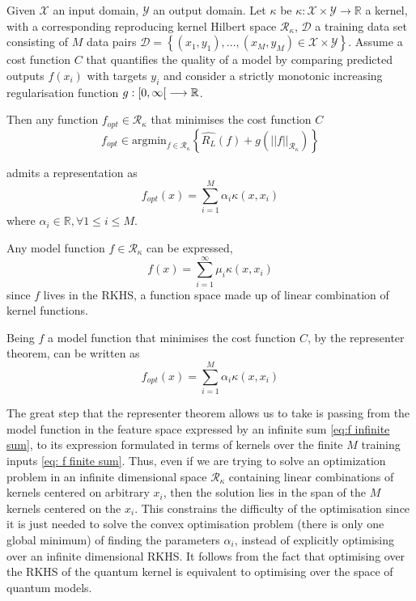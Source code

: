 \begin{teorema}
    Given $\mathcal{X}$ an input domain, $\mathcal{Y}$ an output domain. Let $\kappa$ be $\kappa: \mathcal{X} \times \mathcal{Y} \longrightarrow \mathbb{R}$ a kernel, with a corresponding reproducing kernel Hilbert space $\mathcal{R}_{\kappa}$, $\mathcal{D}$ a training data set consisting of $M$ data pairs $\mathcal{D} = \left\lbrace (x_1,y_1),...,(x_M,y_M) \in \mathcal{X} \times \mathcal{Y} \right\rbrace$. Assume a cost function $C$ that quantifies the quality of a model by comparing predicted outputs $f(x_i)$ with targets $y_i$ and consider a strictly monotonic increasing regularisation function $g: \interval[open right]{0}{\infty} \longrightarrow \mathbb{R}$.

    Then any function $f_{opt} \in \mathcal{R}_{\kappa}$ that minimises the cost function $C$
    \begin{equation*}
        f_{opt} \in \mathrm{argmin}_{f \in \mathcal{R}_{\kappa}} \left\lbrace \hat{R_L}(f) + g(||f||_{\mathcal{R}_{\kappa}}) \right\rbrace
    \end{equation*}
    
    admits a representation as
    \begin{equation}\label{eq:representer theorem}
        f_{opt}(x)=\sum_{i=1}^M \alpha_i \kappa(x, x_i) 
    \end{equation}
    where $\alpha_i \in \mathbb{R}, \forall 1 \leq i \leq M$.
\end{teorema}

Any model function $f \in \mathcal{R}_{\kappa}$ can be expressed,
\begin{equation}
    f(x)=\sum_{i=1}^{\infty}\mu_i \kappa(x,x_i) \label{eq:f infinite sum} \tag{$*$}
\end{equation}
since $f$ lives in the RKHS, a function space made up of linear combination of kernel functions.

Being $f$ a model function that minimises the cost function  $C$, by the representer theorem, can be written as
\begin{equation}
    f_{opt}(x)=\sum_{i=1}^M \alpha_i \kappa(x, x_i) \label{eq: f finite sum} \tag{$**$}
\end{equation}

The great step that the representer theorem allows us to take is passing from the model function in the feature space expressed by an infinite sum \eqref{eq:f infinite sum}, to its expression formulated in terms of kernels over the finite $M$ training inputs \eqref{eq: f finite sum}. Thus, even if we are trying to solve an optimization problem in an infinite dimensional space $\mathcal{R}_{\kappa}$ containing linear combinations of kernels centered on arbitrary $x_i$, then the solution lies in the span of the $M$ kernels centered on the $x_i$. This constrains the difficulty of the optimisation since it is just needed to solve the convex optimisation problem (there is only one global minimum) of finding the parameters $\alpha_i$, instead of explicitly optimising over an infinite dimensional RKHS. It follows from the fact that optimising over the RKHS of the quantum kernel is equivalent to optimising over the space of quantum models.


